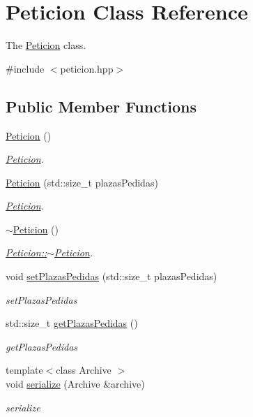 \hypertarget{classPeticion}{}\section{Peticion Class Reference}
\label{classPeticion}


The \hyperlink{classPeticion}{Peticion} class.  




{\ttfamily \#include $<$peticion.\+hpp$>$}

\subsection*{Public Member Functions}
\begin{DoxyCompactItemize}
\item 
\hyperlink{classPeticion_a04b4090032ff49bcbf965bdd2af9ae90}{Peticion} ()
\begin{DoxyCompactList}\small\item\em \hyperlink{classPeticion}{Peticion}. \end{DoxyCompactList}\item 
\hyperlink{classPeticion_adca26c8f1c41bc14c69cad5ac7713e3c}{Peticion} (std\+::size\+\_\+t plazas\+Pedidas)
\begin{DoxyCompactList}\small\item\em \hyperlink{classPeticion}{Peticion}. \end{DoxyCompactList}\item 
\hypertarget{classPeticion_a438d291b0d274b263c1181e49b5a338d}{}\hyperlink{classPeticion_a438d291b0d274b263c1181e49b5a338d}{$\sim$\+Peticion} ()\label{classPeticion_a438d291b0d274b263c1181e49b5a338d}

\begin{DoxyCompactList}\small\item\em \hyperlink{classPeticion_a438d291b0d274b263c1181e49b5a338d}{Peticion\+::$\sim$\+Peticion}. \end{DoxyCompactList}\item 
void \hyperlink{classPeticion_a75bbeae7cedba0b5c32993f1f3f9c7e1}{set\+Plazas\+Pedidas} (std\+::size\+\_\+t plazas\+Pedidas)
\begin{DoxyCompactList}\small\item\em set\+Plazas\+Pedidas \end{DoxyCompactList}\item 
std\+::size\+\_\+t \hyperlink{classPeticion_a58a129027db952f86676a721c7acc6c4}{get\+Plazas\+Pedidas} ()
\begin{DoxyCompactList}\small\item\em get\+Plazas\+Pedidas \end{DoxyCompactList}\item 
{\footnotesize template$<$class Archive $>$ }\\void \hyperlink{classPeticion_a5b7cd0f006e3bb6d6361d065a1bc1c56}{serialize} (Archive \&archive)
\begin{DoxyCompactList}\small\item\em serialize \end{DoxyCompactList}\end{DoxyCompactItemize}
